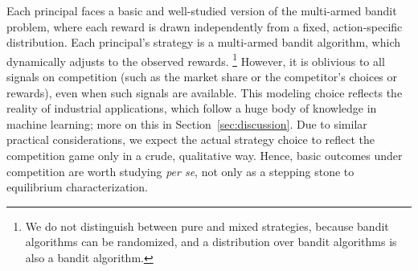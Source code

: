 

Each principal faces a basic and well-studied version of the multi-armed bandit problem, where each reward is drawn independently from a fixed, action-specific distribution. Each principal's strategy is a multi-armed bandit algorithm,
which dynamically adjusts to the observed rewards.%
\footnote{We do not distinguish between pure and mixed strategies, because bandit algorithms can be randomized, and a distribution over bandit algorithms is also a bandit algorithm.}
However, it is oblivious to all signals on competition (such as the market share or the competitor's choices or rewards), even when such signals are available.
This modeling choice reflects the reality of industrial applications, which follow a huge body of knowledge in machine learning; more on this in Section~\ref{sec:discussion}.
Due to similar practical considerations, we expect the actual strategy choice to reflect the competition game only in a crude, qualitative way. Hence,  basic outcomes under competition are worth studying \emph{per se}, not only as a stepping stone to equilibrium characterization.

